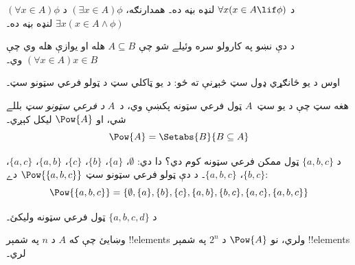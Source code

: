 \documentclass[../../../include/open-logic-section]{subfiles}
\begin{document}
\begin{defn}
$(\forall x \in A)\phi$ د $\forall x(x \in A \lif \phi)$ لنډه بڼه ده۔ همدارنګه، $(\exists x \in A)\phi$ د $\exists x(x \in A \land \phi)$ لنډه بڼه ده۔
\end{defn}

د دې نښو په کارولو سره وئيلے شو چې $A \subseteq B$ هله او يوازې هله وي چې $(\forall x \in A)x \in B$ وي۔

اوس د يو ځانګړي ډول سټ څېړنې ته ځو: د يو ټاکلي سټ د ټولو فرعي سټونو سټ۔

\begin{defn}
هغه سټ چې د يو سټ~$A$ ټول فرعي سټونه پکښې وي، د~$A$ \emph{د فرعي سټونو سټ} بللے شي، او $\Pow{A}$ ليکل کېږي۔
  \[
    \Pow{A} = \Setabs{B}{B \subseteq A}
  \]
\end{defn}

\begin{ex}
د $\{ a, b, c \}$ ټول ممکن فرعي سټونه کوم دي؟ دا دي: $\emptyset$، $\{a \}$، $\{b\}$، $\{c\}$، $\{a, b\}$، $\{a, c\}$، $\{b, c\}$، $\{a, b, c\}$۔ د دې ټولو فرعي سټونو سټ $\Pow{\{a,b,c\}}$ دے:
\[
\Pow{\{ a, b, c \}} = \{\emptyset, \{a \}, \{b\}, \{c\}, \{a, b\},
\{b, c\}, \{a, c\}, \{a, b, c\}\}
\]
\end{ex}

\begin{prob}
د $\{a, b, c, d\}$ ټول فرعي سټونه وليکئ۔
\end{prob}

\begin{prob}
وښايئ چې که $A$ د $n$ په شمېر !!{element}s ولري، نو $\Pow{A}$ د $2^n$ په شمېر !!{element}s لري۔
\end{prob}
\end{document}
